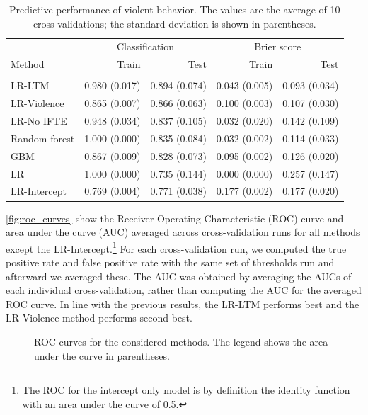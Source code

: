 \documentclass[a4paper,11pt]{article}
\begin{document}
\begin{table}[!ht]
    \caption{Predictive performance of violent behavior. The values are the average of 10 cross validations; the standard deviation is shown in parentheses.}
    \label{tb:predictions}
    \centering
    \begin{tabular}{lrrrr}
        \toprule
        & \multicolumn{2}{c}{Classification} & \multicolumn{2}{c}{Brier score}\\
        \cmidrule(lr){2-3}  \cmidrule(lr){4-5}
        Method & Train & Test & Train & Test \\
        \midrule \\
        LR-LTM & 0.980 (0.017) & 0.894 (0.074) & 0.043 (0.005) & 0.093 (0.034) \\ 
        LR-Violence & 0.865 (0.007) & 0.866 (0.063) & 0.100 (0.003) & 0.107 (0.030) \\ 
        LR-No IFTE & 0.948 (0.034) & 0.837 (0.105) & 0.032 (0.020) & 0.142 (0.109) \\ 
        Random forest & 1.000 (0.000) & 0.835 (0.084) & 0.032 (0.002) & 0.114 (0.033) \\ 
        GBM & 0.867 (0.009) & 0.828 (0.073) & 0.095 (0.002) & 0.126 (0.020) \\ 
        LR & 1.000 (0.000) & 0.735 (0.144) & 0.000 (0.000) & 0.257 (0.147) \\ 
        LR-Intercept & 0.769 (0.004) & 0.771 (0.038) & 0.177 (0.002) & 0.177 (0.020) \\ 
        \bottomrule
    \end{tabular}
\end{table}

\autoref{fig:roc_curves} show the Receiver Operating Characteristic (ROC) curve and area under the curve (AUC) averaged across cross-validation runs for all methods except the LR-Intercept.\footnote{The ROC for the intercept only model is by definition the identity function with an area under the curve of 0.5.}
For each cross-validation run, we computed the true positive rate and false positive rate with the same set of thresholds run and afterward we averaged these.
The AUC was obtained by averaging the AUCs of each individual cross-validation, rather than computing the AUC for the averaged ROC curve.
In line with the previous results, the LR-LTM performs best and the LR-Violence method performs second best.

\begin{figure}[!ht]
    \centering
    
    \caption{ROC curves for the considered methods. The legend shows the area under the curve in parentheses.}
    \label{fig:roc_curves}
\end{figure}
\end{document}
